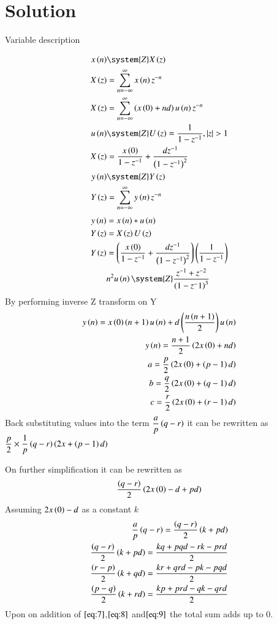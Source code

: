 \documentclass[journal,12pt,twocolumn]{IEEEtran}
\theoremstyle{remark}
\begin{document}
\section*{Solution}
\begin{table}[h]
    \centering
    
    \caption{Variable description}
    \label{tab:11.9.2.11.1}
\end{table}
\begin{align}
	x \brak{n} &\system{Z} X \brak{z} \\
    X \brak{z} &= \sum_{n=-\infty}^{\infty} x \brak{n}   z^{-n}\\
    X \brak{z} & = \sum_{n=-\infty}^{\infty}\brak{x\brak{0}+nd}u\brak{n}z^{-n}\\
    u \brak{n} &\system{Z} U \brak{z} = \dfrac{1}{1-z^{-1}}, |z|>1\\
    X \brak{z} & = \dfrac{x\brak{0}}{1-z^{-1}} + \dfrac{dz^{-1}}{\brak{1-z^{-1}}^{2}}\\
    y \brak{n} &\system{Z} Y \brak{z}\\
    Y\brak{z}&=\sum_{n=-\infty}^{\infty}y\brak{n}z^{-n}
\end{align}
\begin{align}
    y\brak{n}&=x\brak{n}\ast u\brak{n}\\
    Y\brak{z}&=X\brak{z}U\brak{z}\\
    Y\brak{z}&=\brak{\dfrac{x\brak{0}}{1-z^{-1}} + \dfrac{dz^{-1}}{\brak{1-z^{-1}}^{2}}}\brak{\dfrac{1}{1-z^{-1}}}\\
    &n^2u\brak{n}\system{Z} \dfrac{z^{-1}+z^{-2}}{\brak{1-z^-1}^3}
 \end{align}
 By performing inverse Z transform on Y
\begin{align}
    y\left(n\right)=x\left(0\right)\left(n+1\right)u\left(n\right)+d\left(\dfrac{{n\left(n+1\right)}}{2}\right)u\left(n\right)\\
    y\left(n\right)=\dfrac{n+1}{2}\left(2x\left(0\right)+nd\right)\\
    a=\dfrac{p}{2}\left(2x\left(0\right)+\left(p-1\right)d\right)\\
    b=\dfrac{q}{2}\left(2x\left(0\right)+\left(q-1\right)d\right)\\
    c=\dfrac{r}{2}\left(2x\left(0\right)+\left(r-1\right)d\right)
\end{align}
Back substituting values into the term $\dfrac{a}{p}\left(q-r\right)$ it can be rewritten as $\dfrac{p}{2} \times \dfrac{1}{p}\left(q-r\right)\left(2x+\left(p-1\right)d\right)$

On further simplification it can be rewritten as 
\begin{align}
    \dfrac{\left(q-r\right)}{2}\left(2x\left(0\right)-d+pd\right)
\end{align}
Assuming $2x\left(0\right)-d$ as a constant $k$
\begin{align}
    \dfrac{a}{p}\left(q-r\right) = \dfrac{\left(q-r\right)}{2}\left(k+pd\right)\\
    \dfrac{\left(q-r\right)}{2}\left(k+pd\right) = \dfrac{kq+pqd-rk-prd}{2}\label{eq:7}\\
    \dfrac{\left(r-p\right)}{2}\left(k+qd\right) = \dfrac{kr+qrd-pk-pqd}{2}\label{eq:8}\\
    \dfrac{\left(p-q\right)}{2}\left(k+rd\right) = \dfrac{kp+prd-qk-qrd}{2}\label{eq:9}
\end{align}
Upon on addition of $ \eqref{eq:7}$,$ \eqref{eq:8}$ and$ \eqref{eq:9}$ the total sum adds up to 0.
\end{document}
